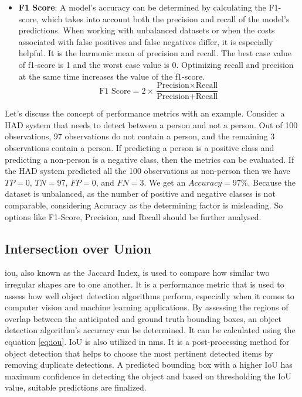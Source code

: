 \begin{itemize}
    \item \textbf{F1 Score}: A model's accuracy can be determined by calculating the F1-score, which takes into account both the precision and recall of the model's predictions. When working with unbalanced datasets or when the costs associated with false positives and false negatives differ, it is especially helpful. It is the harmonic mean of precision and recall. The best case value of f1-score is 1 and the worst case value is 0. Optimizing recall and precision at the same time increases the value of the f1-score.
    \begin{equation}\label{eq:f1-score}
        \text{F1 Score} = 2 \times \frac{\text{Precision} \times \text{Recall}}{\text{Precision} + \text{Recall}}
    \end{equation}
\end{itemize}


Let's discuss the concept of performance metrics with an example. Consider a HAD system that needs to detect between a person and not a person. Out of 100 observations, 97 observations do not contain a person, and the remaining 3 observations contain a person. If predicting a person is a positive class and predicting a non-person is a negative class, then the metrics can be evaluated. If the HAD system predicted all the 100 observations as non-person then we have \(TP = 0\), \(TN = 97\), \(FP = 0\), and \(FN = 3\). We get an \(Accuracy = 97\%\). Because the dataset is unbalanced, as the number of positive and negative classes is not comparable, considering Accuracy as the determining factor is misleading. So options like F1-Score, Precision, and Recall should be further analysed.

\subsection{Intersection over Union}
\acrfull{iou}, also known as the Jaccard Index, is used to compare how similar two irregular shapes are to one another. It is a performance metric that is used to assess how well object detection algorithms perform, especially when it comes to computer vision and machine learning applications. By assessing the regions of overlap between the anticipated and ground truth bounding boxes, an object detection algorithm's accuracy can be determined. It can be calculated using the equation \ref{eq:iou}. IoU is also utilized in \acrfull{nms}. It is a post-processing method for object detection that helps to choose the most pertinent detected items by removing duplicate detections. A predicted bounding box with a higher IoU has maximum confidence in detecting the object and based on thresholding the IoU value, suitable predictions are finalized.

